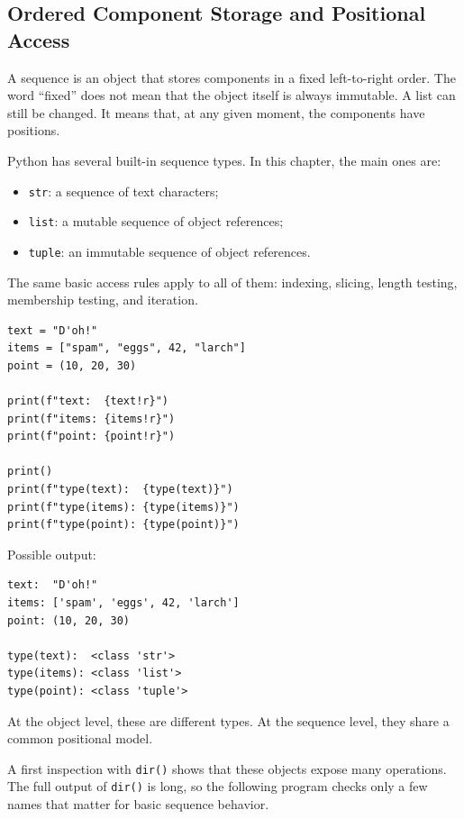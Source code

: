 \subsection{Ordered Component Storage and Positional Access}

A sequence is an object that stores components in a fixed left-to-right order. The word ``fixed'' does not mean that the object itself is always immutable. A list can still be changed. It means that, at any given moment, the components have positions.

Python has several built-in sequence types. In this chapter, the main ones are:

\begin{itemize}
    \item \texttt{str}: a sequence of text characters;
    \item \texttt{list}: a mutable sequence of object references;
    \item \texttt{tuple}: an immutable sequence of object references.
\end{itemize}

The same basic access rules apply to all of them: indexing, slicing, length testing, membership testing, and iteration.

\begin{verbatim}
text = "D'oh!"
items = ["spam", "eggs", 42, "larch"]
point = (10, 20, 30)

print(f"text:  {text!r}")
print(f"items: {items!r}")
print(f"point: {point!r}")

print()
print(f"type(text):  {type(text)}")
print(f"type(items): {type(items)}")
print(f"type(point): {type(point)}")
\end{verbatim}

Possible output:

\begin{verbatim}
text:  "D'oh!"
items: ['spam', 'eggs', 42, 'larch']
point: (10, 20, 30)

type(text):  <class 'str'>
type(items): <class 'list'>
type(point): <class 'tuple'>
\end{verbatim}

At the object level, these are different types. At the sequence level, they share a common positional model.

A first inspection with \texttt{dir()} shows that these objects expose many operations. The full output of \texttt{dir()} is long, so the following program checks only a few names that matter for basic sequence behavior.

